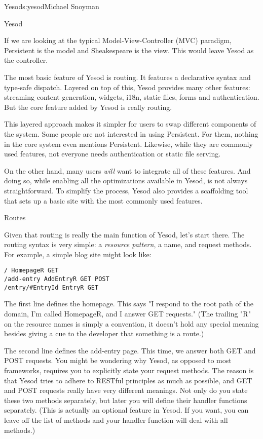 \begin{aosachapter}{Yesod}{s:yesod}{Michael Snoyman}
\begin{aosasect1}{Yesod}

If we are looking at the typical Model-View-Controller (MVC)
paradigm, Persistent is the model and Sheakespeare is the view. This
would leave Yesod as the controller.


The most basic feature of Yesod is routing. It features a declarative
syntax and type-safe dispatch. Layered on top of this, Yesod provides
many other features: streaming content generation, widgets, i18n,
static files, forms and authentication. But the core feature added by
Yesod is really routing.

This layered approach makes it simpler for users to swap different
components of the system. Some people are not interested in using
Persistent. For them, nothing in the core system even mentions
Persistent. Likewise, while they are commonly used features, not everyone needs
authentication or static file serving.

On the other hand, many users \emph{will} want to integrate all of
these features. And doing so, while enabling all the optimizations
available in Yesod, is not always straightforward. To simplify the
process, Yesod also provides a scaffolding tool that sets up a
basic site with the most commonly used features.

\begin{aosasect2}{Routes}

Given that routing is really the main function of Yesod, let's start
there. The routing syntax is very simple: a \emph{resource pattern}, a
name, and request methods. For example, a simple blog site might look
like:

\begin{verbatim}
/ HomepageR GET
/add-entry AddEntryR GET POST
/entry/#EntryId EntryR GET
\end{verbatim}

The first line defines the homepage. This says "I respond to the root
path of the domain, I'm called HomepageR, and I answer GET requests."
(The trailing "R" on the resource names is simply a convention, it
doesn't hold any special meaning besides giving a cue to the developer
that something is a route.)

The second line defines the add-entry page. This time, we answer both
GET and POST requests. You might be wondering why Yesod, as opposed to
most frameworks, requires you to explicitly state your request
methods. The reason is that Yesod tries to adhere to RESTful
principles as much as possible, and GET and POST requests really have
very different meanings. Not only do you state these two methods
separately, but later you will define their handler functions
separately. (This is actually an optional feature in Yesod. If you
want, you can leave off the list of methods and your handler function
will deal with all methods.)


\end{aosasect2}
\end{aosasect1}
\end{aosachapter}
